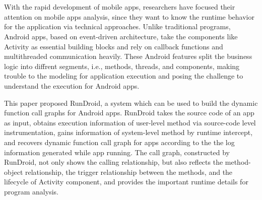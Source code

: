 \newpage

\vspace{-500pt}

\chapter*{}




With the rapid development of mobile apps, researchers have focused their attention on  mobile apps analysis,
since they want to know the runtime behavior for the application via technical approaches.
Unlike traditional programs, Android apps, based on  event-driven architecture,  take the components like Activity as  essential building blocks and  rely on callback functions and multithreaded communication heavily.
These Android features split the business logic into diffrent segments, i.e., methods, threads, and components,  making trouble to the modeling for application execution and  posing the challenge to understand the execution for Android apps.





This paper proposed  RunDroid, a system which can be used to build the dynamic function call graphs for Android apps.
RunDroid takes the source code of an app as input, obtains  execution information of user-level method via  source-code level instrumentation,
gains  information of system-level method by runtime intercept, 
and  recovers dynamic function call graph for apps according to the the log information generated while app running.
The call graph, constructed by RunDroid, not only shows the calling relationship, but also reflects the method-object relationship, the trigger relationship between the methods, and the lifecycle of  Activity component, 
and provides the important runtime details for program analysis.



